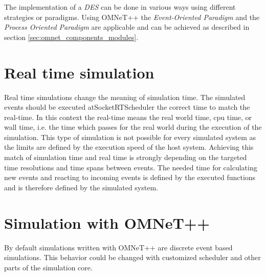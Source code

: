The implementation of a \emph{DES} can be done in various ways using different strategies or paradigms. \cite[chapter 2]{matloff_introduction_2008}
Using OMNeT++ the \emph{Event-Oriented Paradigm} and the \emph{Process Oriented Paradigm} are applicable and can be achieved as described in section \ref{sec:omnet_components_modules}.






\section{Real time simulation} %
\label{sec:simulation_real_time}
Real time simulations change the meaning of simulation time.
The simulated events should be executed atSocketRTScheduler the correct time to match the real-time.
In this context the real-time means the real world time, cpu time, or wall time, i.e. the time which passes for the real world during the execution of the simulation.
This type of simulation is not possible for every simulated system as the limits are defined by the execution speed of the host system.
Achieving this match of simulation time and real time is strongly depending on the targeted time resolutions and time spans between events.
The needed time for calculating new events and reacting to incoming events is defined by the executed functions and is therefore defined by the simulated system.



\section{Simulation with OMNeT++}
\label{sec:simulation_omnet}
By default simulations written with OMNeT++ are discrete event based simulations.
This behavior could be changed with customized scheduler and other parts of the simulation core. \cite[section 4.1]{omnet_manual}

